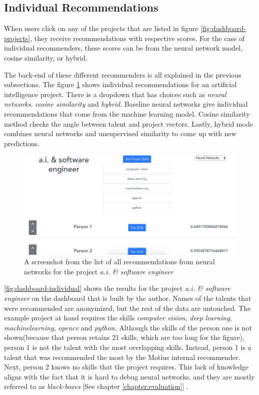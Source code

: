 \subsection{Individual Recommendations}

When users click on any of the projects that are listed in figure \ref{fig:dashboard-projects}, they receive recommendations with respective scores. For the case of individual recommenders, these scores can be from the neural network model, cosine similarity, or hybrid.

The back-end of these different recommenders is all explained in the previous subsections. The figure \ref{fig:dashboard-individual} shows individual recommendations for an artificial intelligence project. There is a dropdown that has choices such as \textit{neural networks}. \textit{cosine similarity} and \textit{hybrid}. Baseline neural networks give individual recommendations that come from the machine learning model. Cosine similarity method checks the angle between talent and project vectors. Lastly, hybrid mode combines neural networks and unsupervised similarity to come up with new predictions.

\begin{figure}[htp]
	\centering
	\includegraphics[width=\textwidth]{figures/DashboardIndividual.png}
	\caption{A screenshot from the list of all recommendations from neural networks for the project \textit{a.i. \& software engineer}}
	\label{fig:dashboard-individual}
\end{figure}

\autoref{fig:dashboard-individual} shows the results for the project \textit{a.i. \& software engineer} on the dashboard that is built by the author. Names of the talents that were recommended are anonymized, but the rest of the data are untouched. The example project at hand requires the skills \textit{computer vision}, \textit{deep learning}, \textit{machinelearning}, \textit{opencv} and \textit{python}. Although the skills of the person one is not shown(because that person retains 21 skills, which are too long for the figure), person 1 is not the talent with the most overlapping skills. Instead, person 1 is a talent that was recommended the most by the Motius internal recommender. Next, person 2 knows no skills that the project requires. This lack of knowledge aligns with the fact that it is hard to debug neural networks, and they are mostly referred to as \textit{black-boxes} [See chapter \ref{chapter:evaluation}] \cite{benitez1997artificial}.

